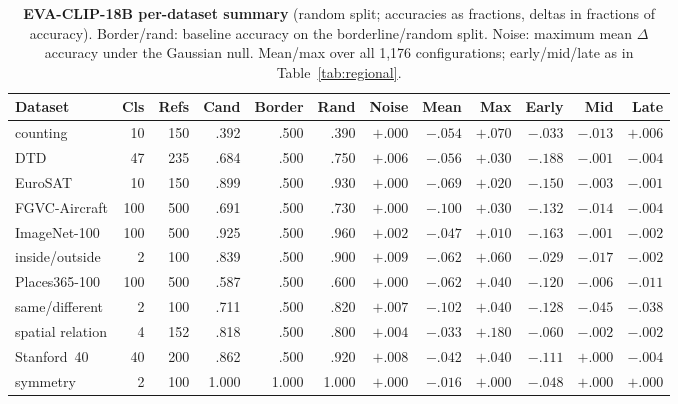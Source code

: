 \documentclass{article}
\newcommand{\eva}{EVA-CLIP-18B}
\begin{document}
\begin{table}[h]
\caption{\textbf{\eva{} per-dataset summary} (random split; accuracies as
fractions, deltas in fractions of accuracy). Border/rand: baseline
accuracy on the borderline/random split. Noise: maximum mean
$\Delta$accuracy under the Gaussian null. Mean/max over all 1{,}176
configurations; early/mid/late as in Table~\ref{tab:regional}.}
\label{tab:evadatasets}
\centering
\scriptsize
\setlength{\tabcolsep}{3.4pt}
\begin{tabular}{lrrrrrrrrrrr}
\toprule
Dataset & Cls & Refs & Cand & Border & Rand & Noise & Mean & Max & Early & Mid & Late \\
\midrule
counting & 10 & 150 & .392 & .500 & .390 & $+.000$ & $-.054$ & $+.070$ & $-.033$ & $-.013$ & $+.006$ \\
DTD & 47 & 235 & .684 & .500 & .750 & $+.006$ & $-.056$ & $+.030$ & $-.188$ & $-.001$ & $-.004$ \\
EuroSAT & 10 & 150 & .899 & .500 & .930 & $+.000$ & $-.069$ & $+.020$ & $-.150$ & $-.003$ & $-.001$ \\
FGVC-Aircraft & 100 & 500 & .691 & .500 & .730 & $+.000$ & $-.100$ & $+.030$ & $-.132$ & $-.014$ & $-.004$ \\
ImageNet-100 & 100 & 500 & .925 & .500 & .960 & $+.002$ & $-.047$ & $+.010$ & $-.163$ & $-.001$ & $-.002$ \\
inside/outside & 2 & 100 & .839 & .500 & .900 & $+.009$ & $-.062$ & $+.060$ & $-.029$ & $-.017$ & $-.002$ \\
Places365-100 & 100 & 500 & .587 & .500 & .600 & $+.000$ & $-.062$ & $+.040$ & $-.120$ & $-.006$ & $-.011$ \\
same/different & 2 & 100 & .711 & .500 & .820 & $+.007$ & $-.102$ & $+.040$ & $-.128$ & $-.045$ & $-.038$ \\
spatial relation & 4 & 152 & .818 & .500 & .800 & $+.004$ & $-.033$ & $+.180$ & $-.060$ & $-.002$ & $-.002$ \\
Stanford~40 & 40 & 200 & .862 & .500 & .920 & $+.008$ & $-.042$ & $+.040$ & $-.111$ & $+.000$ & $-.004$ \\
symmetry & 2 & 100 & 1.000 & 1.000 & 1.000 & $+.000$ & $-.016$ & $+.000$ & $-.048$ & $+.000$ & $+.000$ \\
\bottomrule
\end{tabular}
\end{table}
\end{document}
